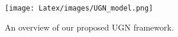 \begin{figure}[t]
\centering
\texttt{[image: Latex/images/UGN\_model.png]}
\caption{
\small An overview of our proposed UGN framework.
}
\label{fig:arch}
\end{figure}